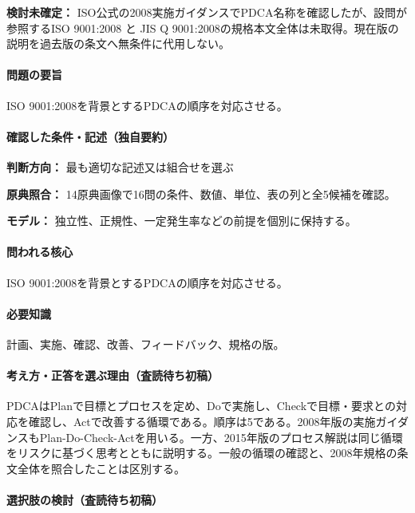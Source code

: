 \par\textbf{検討未確定：} ISO公式の2008実施ガイダンスでPDCA名称を確認したが、設問が参照するISO 9001:2008 と JIS Q 9001:2008の規格本文全体は未取得。現在版の説明を過去版の条文へ無条件に代用しない。

\paragraph{問題の要旨} ISO 9001:2008を背景とするPDCAの順序を対応させる。

\paragraph{確認した条件・記述（独自要約）}\mbox{}\par

\noindent\textbf{判断方向：} 最も適切な記述又は組合せを選ぶ\par

\noindent\textbf{原典照合：} 14原典画像で16問の条件、数値、単位、表の列と全5候補を確認。\par

\noindent\textbf{モデル：} 独立性、正規性、一定発生率などの前提を個別に保持する。\par

\paragraph{問われる核心} ISO 9001:2008を背景とするPDCAの順序を対応させる。

\paragraph{必要知識} 計画、実施、確認、改善、フィードバック、規格の版。

\paragraph{考え方・正答を選ぶ理由（査読待ち初稿）} PDCAはPlanで目標とプロセスを定め、Doで実施し、Checkで目標・要求との対応を確認し、Actで改善する循環である。順序は5である。2008年版の実施ガイダンスもPlan-Do-Check-Actを用いる。一方、2015年版のプロセス解説は同じ循環をリスクに基づく思考とともに説明する。一般の循環の確認と、2008年規格の条文全体を照合したことは区別する。

\paragraph{選択肢の検討（査読待ち初稿）}\mbox{}\par

